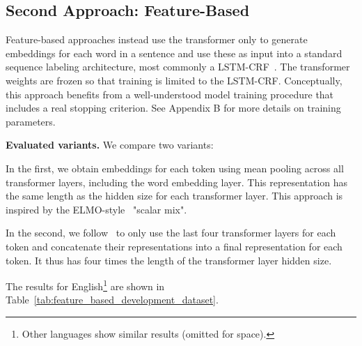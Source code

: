 \subsection{Second Approach: Feature-Based}
\label{sec:feature_based}
\vspace{-1mm}

Feature-based approaches instead use the transformer only to generate embeddings for each word in a sentence and use these as input into a standard sequence labeling architecture, most commonly a LSTM-CRF~\cite{2015arXiv150801991H}. The transformer weights are frozen so that training is limited to the LSTM-CRF. Conceptually, this approach benefits from a well-understood model training procedure that includes a real stopping criterion. See Appendix B for more details on training parameters. 

\noindent 
\textbf{Evaluated variants.} 
We compare two variants:
\begin{description}
\vspace{-1mm}
\item[All-layer-mean] In the first, we obtain embeddings for each token using mean pooling across all transformer layers, including the word embedding layer. This representation has the same length as the hidden size for each transformer layer. This approach is inspired by the ELMO-style~\cite{peters-etal-2018-deep} "scalar mix".
\vspace{-1mm}
\item[Last-four-layers] In the second, we follow~\citet{devlin-etal-2019-bert} to only use the last four transformer layers for each token and concatenate their representations into a final representation for each token. It thus has four times the length of the transformer layer hidden size.
\end{description}
The results for English\footnote{Other languages show similar results (omitted for space).} are shown in Table~\ref{tab:feature_based_development_dataset}.
